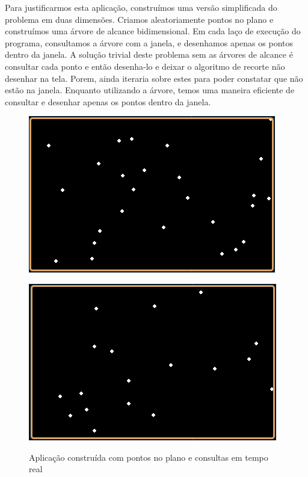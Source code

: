 Para justificarmos esta aplicação, construímos uma versão simplificada do problema em duas dimensões. Criamos aleatoriamente pontos no plano e construímos uma árvore de alcance bidimensional. Em cada laço de execução do programa, consultamos a árvore com a janela, e desenhamos apenas os pontos dentro da janela. A solução trivial deste problema sem as árvores de alcance é consultar cada ponto e então desenha-lo e deixar o algoritmo de recorte \cite{folley01} não desenhar na tela. Porem, ainda iteraria sobre estes para poder constatar que não estão na janela. Enquanto utilizando a árvore, temos uma maneira eficiente de consultar e desenhar apenas os pontos dentro da janela.

\begin{figure}[h!]
\centering
\begin{minipage}{.5\textwidth}
  \centering
  \includegraphics[width=.8\linewidth]{images/Captura de tela de 2021-04-16 11-43-23.png}
 
  \label{fig:sub1}
\end{minipage}%
\begin{minipage}{.5\textwidth}
  \centering
  \includegraphics[width=.8\linewidth]{images/Captura de tela de 2021-04-16 11-43-35.png}
  
  \label{fig:sub2}
\end{minipage}
\caption{Aplicação construída com pontos no plano e consultas em tempo real}
\label{fig:test}
\end{figure}

